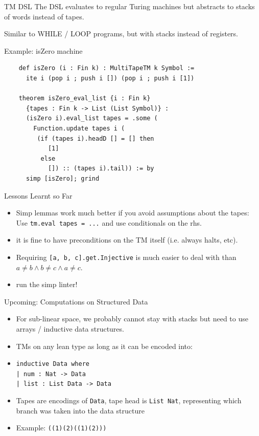 \documentclass{beamer}
\begin{document}
\begin{frame}[fragile]{TM DSL}
  The DSL evaluates to regular Turing machines but abstracts to stacks of words instead of tapes.

  Similar to WHILE / LOOP programs, but with stacks instead of registers.

  \begin{block}{Example: isZero machine}
  \begin{lstlisting}
    def isZero (i : Fin k) : MultiTapeTM k Symbol :=
      ite i (pop i ; push i []) (pop i ; push i [1])

    theorem isZero_eval_list {i : Fin k}
      {tapes : Fin k -> List (List Symbol)} :
      (isZero i).eval_list tapes = .some (
        Function.update tapes i (
         (if (tapes i).headD [] = [] then
            [1]
          else
            []) :: (tapes i).tail)) := by
      simp [isZero]; grind
  \end{lstlisting}
  \end{block}
\end{frame}

\begin{frame}{Lessons Learnt so Far}
  \begin{itemize}
    \item Simp lemmas work much better if you avoid assumptions about the tapes:
      Use \texttt{tm.eval tapes = ...} and use conditionals on the rhs.
    \item it is fine to have preconditions on the TM itself (i.e. always halts, etc).
    \item Requiring \texttt{[a, b, c].get.Injective} is much easier to deal with than
       $a \neq b \land b \neq c \land a \neq c$.
    \item run the simp linter!
  \end{itemize}
\end{frame}

\begin{frame}{Upcoming: Computations on Structured Data}
  \begin{itemize}
    \item For sub-linear space, we probably cannot stay with stacks but need to use arrays / inductive data structures.
    \item TMs on any lean type as long as it can be encoded into:
    \item \texttt{inductive Data where\\ | num : Nat -> Data\\ | list : List Data -> Data}
    \item Tapes are encodings of \texttt{Data}, tape head is \texttt{List Nat}, representing which branch was taken into the data structure
    \item Example: \texttt{((1)(2)((1)(2)))}
  \end{itemize}
\end{frame}
\end{document}
